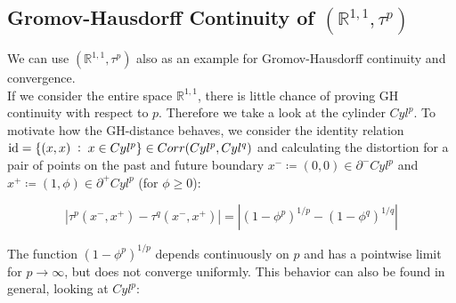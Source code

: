 \documentclass[11pt, a4paper]{article} %
\newcommand{\R}{\mathbb{R}} %
\theoremstyle{plain} %
\newcommand{\mDef}{\coloneqq }
\newcommand{\pp}{\; \vcentcolon \;}
\begin{document}
\subsection{Gromov-Hausdorff Continuity of \texorpdfstring{$(\R^{1,1},\tau^p)$}{TEXT}}
We can use $(\R^{1,1},\tau^p)$ also as an example for Gromov-Hausdorff continuity and convergence.\\
If we consider the entire space $\R^{1,1}$, there is little chance of proving GH continuity with respect to $p$. Therefore we take a look at the cylinder $Cyl^p$.
To motivate how the GH-distance behaves, we consider the identity relation $\text{id} = \{(x,x)\pp x\in Cyl^p\}\in Corr(Cyl^p,Cyl^q)$ and calculating the distortion for a pair of points on the past and future boundary $x^- \mDef (0,0)\in \partial^-Cyl^p$ and $x^+ \mDef (1,\phi)\in \partial^+ Cyl^p$ (for $\phi\geq 0$):

$$\left| \tau^p(x^-,x^+) - \tau^q(x^-,x^+)\right| = \left| (1-\phi^p)^{1/p} - (1-\phi^q)^{1/q} \right|$$

The function $ (1-\phi^p)^{1/p}$ depends continuously on $p$ and has a pointwise limit for $p\to\infty$, but does not converge uniformly. This behavior can also be found in general, looking at $Cyl^p$:
\end{document}
